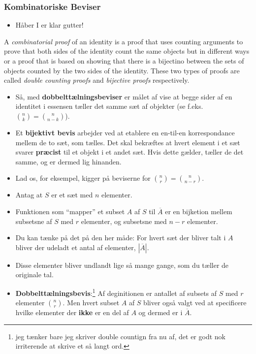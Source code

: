 \documentclass{beamer}
\begin{document}
\begin{frame}[allowframebreaks]
  \frametitle{Kombinatoriske Beviser}
  \begin{itemize}
  \item Håber I er klar gutter!
  \end{itemize}
  \begin{definition}
A \textit{combinatorial proof} of an identity is a proof that uses counting arguments to prove that both sides of the identity count the same objects but in different ways or a proof that is based on showing that there is a bijectino between the sets of objects counted by the two sides of the identity. These two types of proofs are called \textit{double counting proofs} and \textit{bijective proofs} respectively.
  \end{definition}
  \begin{itemize}
  \item Så, med \textbf{dobbelttælningsbeviser} er målet af vise at begge sider af en identitet i essensen tæller det samme sæt af objekter (se f.eks. $\binom{n}{k} = \binom{n}{n-k}$).
  \item Et \textbf{bijektivt bevis} arbejder ved at etablere en en-til-en korrespondance mellem de to sæt, som tælles. Det skal bekræftes at hvert element i et sæt svarer \textbf{præcist} til et objekt i et andet sæt. Hvis dette gælder, tæller de det samme, og er dermed lig hinanden. 
  \item Lad os, for eksempel, kigger på beviserne for $\binom{n}{r} = \binom{n}{n-r}$. 
  \item Antag at $S$ er et sæt med $n$ elementer. 
  \item Funktionen som ``mapper'' et subset $A$ af $S$ til $\overline{A}$  er en bijketion mellem subsetsne af $S$ med $r$ elementer, og subsetsne med $n-r$ elementer.
  \item Du kan tænke på det på den her måde: For hvert sæt der bliver talt i $A$ bliver der udeladt et antal af elementer, $|\overline{A}|$. 
  \item Disse elementer bliver undlandt lige så mange gange, som du tæller de originale tal.
  \item \textbf{Dobbelttælningsbevis}:\footnote{jeg tænker bare jeg skriver double countign fra nu af, det er godt nok irriterende at skrive et så langt ord.} Af deginitionen er antallet af subsets af $S$ med $r$ elementer $\binom{n}{r}$. Men hvert subset $A$ af $S$ bliver også valgt ved at specificere hvilke elementer der \textbf{ikke} er en del af $A$ og dermed er i $\overline{A}$. 

\end{itemize}
\end{frame}
\end{document}
